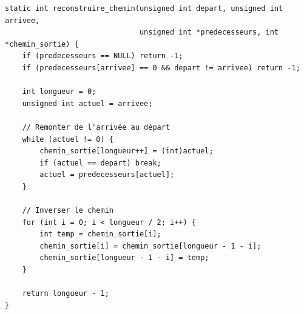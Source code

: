 \begin{lstlisting}[caption={reconstruire\_chemin}]
static int reconstruire_chemin(unsigned int depart, unsigned int arrivee,
                               unsigned int *predecesseurs, int *chemin_sortie) {
    if (predecesseurs == NULL) return -1;
    if (predecesseurs[arrivee] == 0 && depart != arrivee) return -1;

    int longueur = 0;
    unsigned int actuel = arrivee;
    
    // Remonter de l'arrivée au départ
    while (actuel != 0) {
        chemin_sortie[longueur++] = (int)actuel;
        if (actuel == depart) break;
        actuel = predecesseurs[actuel];
    }

    // Inverser le chemin
    for (int i = 0; i < longueur / 2; i++) {
        int temp = chemin_sortie[i];
        chemin_sortie[i] = chemin_sortie[longueur - 1 - i];
        chemin_sortie[longueur - 1 - i] = temp;
    }
    
    return longueur - 1;
}

\end{lstlisting}